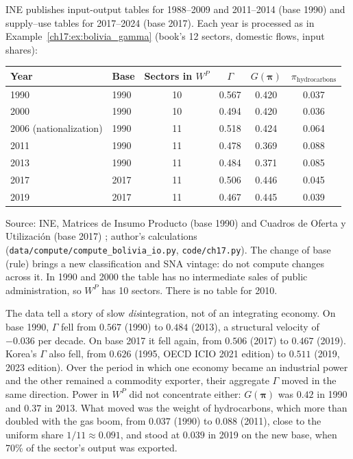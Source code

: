\documentclass[../structural_economics_book.tex]{subfiles}
\begin{document}
\begin{example}\label{ch17:ex:trajectory}
INE publishes input-output tables for 1988--2009 and 2011--2014 (base 1990) and supply--use tables for 2017--2024 (base 2017). Each year is processed as in Example~\ref{ch17:ex:bolivia_gamma} (book's 12 sectors, domestic flows, input shares):

\begin{center}
\begin{tabular}{llcccc}
\toprule
Year & Base & Sectors in $W^P$ & $\Gamma$ & $G(\boldsymbol{\pi})$ & $\pi_{\text{hydrocarbons}}$ \\
\midrule
1990 & 1990 & 10 & 0.567 & 0.420 & 0.037 \\
2000 & 1990 & 10 & 0.494 & 0.420 & 0.036 \\
2006 (nationalization) & 1990 & 11 & 0.518 & 0.424 & 0.064 \\
2011 & 1990 & 11 & 0.478 & 0.369 & 0.088 \\
2013 & 1990 & 11 & 0.484 & 0.371 & 0.085 \\
\midrule
2017 & 2017 & 11 & 0.506 & 0.446 & 0.045 \\
2019 & 2017 & 11 & 0.467 & 0.445 & 0.039 \\
\bottomrule
\end{tabular}
\par\footnotesize Source: INE, Matrices de Insumo Producto (base 1990) and Cuadros de Oferta y Utilizaci\'{o}n (base 2017) \citep{ine2026sut}; author's calculations (\texttt{data/compute/compute\_bolivia\_io.py}, \texttt{code/ch17.py}). The change of base (rule) brings a new classification and SNA vintage: do not compute changes across it. In 1990 and 2000 the table has no intermediate sales of public administration, so $W^P$ has 10 sectors. There is no table for 2010.
\end{center}

The data tell a story of slow \textit{dis}integration, not of an integrating economy. On base 1990, $\Gamma$ fell from $0.567$ (1990) to $0.484$ (2013), a structural velocity of $-0.036$ per decade. On base 2017 it fell again, from $0.506$ (2017) to $0.467$ (2019). Korea's $\Gamma$ also fell, from $0.626$ (1995, OECD ICIO 2021 edition) to $0.511$ (2019, 2023 edition). Over the period in which one economy became an industrial power and the other remained a commodity exporter, their aggregate $\Gamma$ moved in the same direction. Power in $W^P$ did not concentrate either: $G(\boldsymbol{\pi})$ was $0.42$ in 1990 and $0.37$ in 2013. What moved was the weight of hydrocarbons, which more than doubled with the gas boom, from $0.037$ (1990) to $0.088$ (2011), close to the uniform share $1/11 \approx 0.091$, and stood at $0.039$ in 2019 on the new base, when 70\% of the sector's output was exported.


\end{example}
\end{document}
